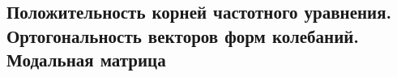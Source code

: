 

\subsection{Положительность корней частотного уравнения. Ортогональность векторов форм колебаний. Модальная матрица}



